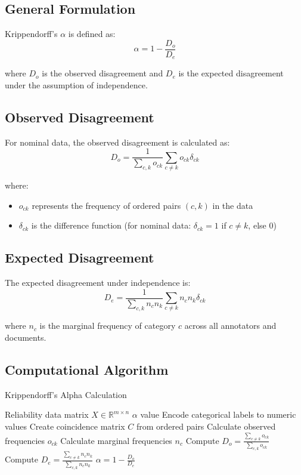 \documentclass[11pt]{article}
\begin{document}
\subsection{General Formulation}

Krippendorff's $\alpha$ is defined as:
\begin{equation}
\alpha = 1 - \frac{D_o}{D_e}
\end{equation}

where $D_o$ is the observed disagreement and $D_e$ is the expected disagreement under the assumption of independence.

\subsection{Observed Disagreement}

For nominal data, the observed disagreement is calculated as:
\begin{equation}
D_o = \frac{1}{\sum_{c,k} o_{ck}} \sum_{c \neq k} o_{ck} \delta_{ck}
\end{equation}

where:
\begin{itemize}
\item $o_{ck}$ represents the frequency of ordered pairs $(c,k)$ in the data
\item $\delta_{ck}$ is the difference function (for nominal data: $\delta_{ck} = 1$ if $c \neq k$, else $0$)
\end{itemize}

\subsection{Expected Disagreement}

The expected disagreement under independence is:
\begin{equation}
D_e = \frac{1}{\sum_{c,k} n_c n_k} \sum_{c \neq k} n_c n_k \delta_{ck}
\end{equation}

where $n_c$ is the marginal frequency of category $c$ across all annotators and documents.

\subsection{Computational Algorithm}

\begin{algorithm}
\caption{Krippendorff's Alpha Calculation}
\begin{algorithmic}[1]
\REQUIRE Reliability data matrix $X \in \mathbb{R}^{m \times n}$
\ENSURE $\alpha$ value
\STATE Encode categorical labels to numeric values
\STATE Create coincidence matrix $C$ from ordered pairs
\STATE Calculate observed frequencies $o_{ck}$
\STATE Calculate marginal frequencies $n_c$
\STATE Compute $D_o = \frac{\sum_{c \neq k} o_{ck}}{\sum_{c,k} o_{ck}}$
\STATE Compute $D_e = \frac{\sum_{c \neq k} n_c n_k}{\sum_{c,k} n_c n_k}$
\STATE \RETURN $\alpha = 1 - \frac{D_o}{D_e}$
\end{algorithmic}
\end{algorithm}
\end{document}
